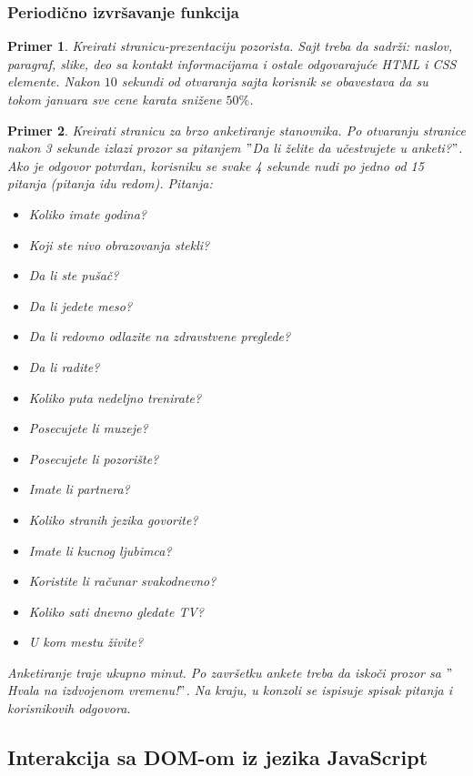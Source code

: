 \documentclass[a4paper]{article}
\newtheorem{primer}{Primer}[section]
\begin{document}
\subsubsection{Periodično izvršavanje funkcija}
\begin{primer}
Kreirati stranicu-prezentaciju pozorista. Sajt treba da sadrži: naslov, paragraf, slike, deo sa kontakt informacijama i ostale odgovarajuće HTML i CSS elemente. Nakon $10$ sekundi od otvaranja sajta korisnik se obavestava da su tokom januara sve cene karata snižene $50\%$. 
\end{primer}

\begin{primer}
Kreirati stranicu za brzo anketiranje stanovnika. Po otvaranju stranice nakon 3 sekunde izlazi prozor sa pitanjem $"$Da li želite da učestvujete u anketi?$"$. Ako je odgovor potvrdan, korisniku se svake 4 sekunde nudi po jedno od 15 pitanja (pitanja idu redom). Pitanja:
\begin{itemize}
\item Koliko imate godina?
\item Koji ste nivo obrazovanja stekli?
\item Da li ste pušač?
\item Da li jedete meso?
\item Da li redovno odlazite na zdravstvene preglede?
\item Da li radite?
\item Koliko puta nedeljno trenirate?
\item Posecujete li muzeje?
\item Posecujete li pozorište?
\item Imate li partnera?
\item Koliko stranih jezika govorite?
\item Imate li kucnog ljubimca?
\item Koristite li računar svakodnevno?
\item Koliko sati dnevno gledate TV?
\item U kom mestu živite?
\end{itemize}  
Anketiranje traje ukupno minut. Po završetku ankete treba da iskoči prozor sa $"$Hvala na izdvojenom vremenu!$"$. Na kraju, u konzoli se ispisuje spisak pitanja i korisnikovih odgovora. 
\end{primer}

\subsection{Interakcija sa DOM-om iz jezika JavaScript}
\end{document}
